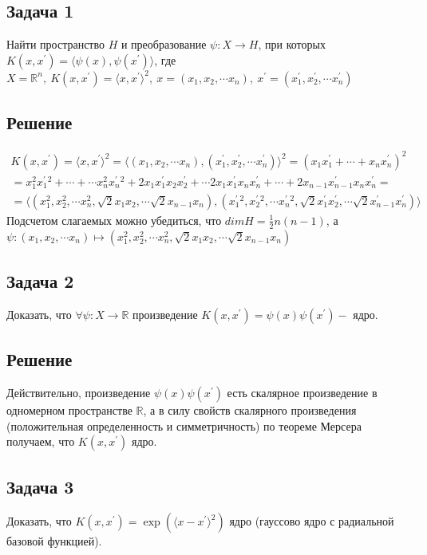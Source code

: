 \subsection{Задача 1}
Найти пространство $H$ и преобразование $\psi: X \rightarrow H$, при которых
$K(x, x^{\prime}) = \langle \psi(x),\psi(x^{\prime}) \rangle $, где $X = \mathbb{R}^n,~
K(x, x^{\prime}) = \langle x, x^{\prime} \rangle^2,~ x = (x_1, x_2, \cdots x_n),~ x^{\prime} = (x_1^{\prime}, x_2^{\prime}, \cdots x_n^{\prime})$
\subsection{Решение}
\begin{align*}
K(x, x^{\prime}) = \langle x, x^{\prime} \rangle^2 = \langle (x_1, x_2, \cdots x_n), (x_1^{\prime}, x_2^{\prime}, \cdots x_n^{\prime}) \rangle^2 = (x_1x_1^{\prime} + \cdots + x_nx_n^{\prime})^2  \\
  = x_1^2x_1^{\prime}^2 + \cdots + \cdots x_n^2x_n^{\prime}^2 + 2x_1x_1^{\prime}x_2x_2^{\prime} + \cdots 2x_1x_1^{\prime}x_{n}x_n^{\prime} + \cdots + 2x_{n-1}x_{n-1}^{\prime}x_{n}x_{n}^{\prime}  = \\
  = \langle(x_1^2, x_2^2, \cdots x_n^2, \sqrt{2}x_1x_2, \cdots \sqrt{2}x_{n-1}x_n),(x_1^{\prime}^2, x_2^{\prime}^2, \cdots x_n^{\prime}^2, \sqrt{2}x_1^{\prime}x_2^{\prime},\cdots \sqrt{2}x_{n-1}^{\prime}x_{n}^{\prime})\rangle
\end{align*}
Подсчетом слагаемых можно убедиться, что $ dimH = \frac{1}{2}n(n-1) $, а $\psi:(x_1, x_2, \cdots x_n) \mapsto(x_1^2, x_2^2, \cdots x_n^2, \sqrt{2}x_1x_2, \cdots \sqrt{2}x_{n-1}x_n)$

\subsection{Задача 2}
Доказать, что $\forall \psi: X \rightarrow \mathbb{R}$ произведение $K\left(x, x^{\prime}\right)=\psi(x) \psi\left(x^{\prime}\right)-$ ядро.
\subsection{Решение}

Действительно, произведение $\psi(x) \psi(x^{\prime})$ есть скалярное произведение в одномерном пространстве $\mathbb{R}$, а в силу свойств скалярного произведения
(положительная определенность и симметричность) по теореме Мерсера получаем, что $K(x, x^{\prime})$ ядро.

\subsection{Задача 3}
Доказать, что $K(x, x^{\prime})=\exp(\langle x - x^{\prime} \rangle^2)$ ядро (гауссово ядро с радиальной базовой функцией).
